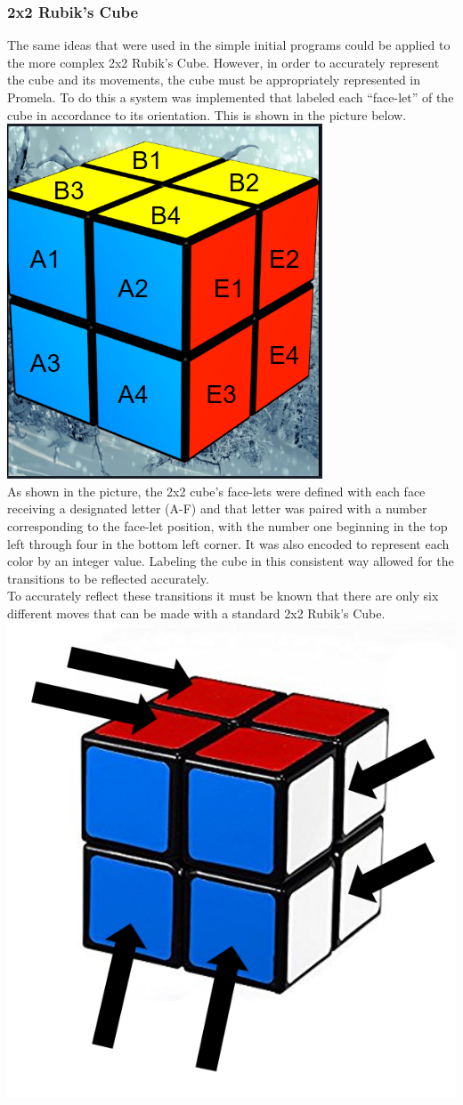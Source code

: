 \documentclass{article}
\begin{document}
\subsubsection{2x2 Rubik's Cube}
The same ideas that were used in the simple initial programs could be applied to the more complex 2x2 Rubik's Cube. However, in order to accurately represent the cube and its movements, the cube must be appropriately represented in Promela. To do this a system was implemented that labeled each ``face-let'' of the cube in accordance to its orientation. This is shown in the picture below. \\[7mm]
\includegraphics[width=.5\textwidth, center]{pics/Facelet.PNG} \\[7mm]
As shown in the picture, the 2x2 cube's face-lets were defined with each face receiving a designated letter (A-F) and that letter was paired with a number corresponding to the face-let position, with the number one beginning in the top left through four in the bottom left corner. It was also encoded to represent each color by an integer value. Labeling the cube in this consistent way allowed for the transitions to be reflected accurately. \\[3mm]
To accurately reflect these transitions it must be known that there are only six different moves that can be made with a standard 2x2 Rubik's Cube. \\[7mm]
\includegraphics[width=.5\textwidth, center]{pics/Capture5} \\[7mm]
\end{document}
